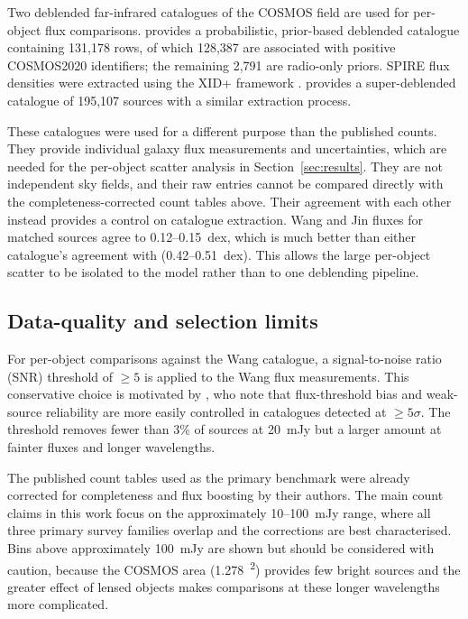 \documentclass[12pt,a4paper]{article}
\begin{document}
Two deblended far-infrared catalogues of the COSMOS field are used for per-object flux
comparisons. \citet{Wang_2024} provides a probabilistic, prior-based deblended catalogue
containing 131,178 rows, of which 128,387 are associated with positive COSMOS2020
identifiers; the remaining 2,791 are radio-only priors. SPIRE flux densities were
extracted using the XID+ framework \citep{Hurley_2017}. \citet{Jin_2018} provides a
super-deblended catalogue of 195,107 sources with a similar extraction process.

These catalogues were used for a different purpose than the published counts. They provide
individual galaxy flux measurements and uncertainties, which are needed for the
per-object scatter analysis in Section~\ref{sec:results}. They are not
independent sky fields, and their raw entries cannot be compared directly with the
completeness-corrected count tables above. Their agreement with each other instead
provides a control on catalogue extraction. Wang and Jin fluxes for matched sources agree to
0.12--\SI{0.15}{dex}, which is much better than either catalogue's agreement with
\popcosmos{} (0.42--\SI{0.51}{dex}). This allows the large per-object scatter to be isolated to
the model rather than to one deblending pipeline.

\subsection{Data-quality and selection limits}
\label{sec:data:quality}

For per-object comparisons against the Wang catalogue, a signal-to-noise ratio (SNR)
threshold of $\geq 5$ is applied to the Wang flux measurements. This conservative choice
is motivated by \citet{Clements_1999}, who note that flux-threshold bias and weak-source reliability are
more easily controlled in catalogues detected at $\geq 5\sigma$.
The threshold removes fewer than 3\% of sources at \SI{20}{mJy} but a larger amount
at fainter fluxes and longer wavelengths.

The published count tables used as the primary benchmark were already corrected for
completeness and flux boosting by their authors. The main count claims in this work focus on
the approximately 10--\SI{100}{mJy} range, where all three primary survey families
overlap and the corrections are best characterised. Bins above approximately
\SI{100}{mJy} are shown but should be considered with caution, because the COSMOS area
(\SI{1.278}{\deg\squared}) provides few bright sources and the greater effect of lensed
objects makes comparisons at these longer wavelengths more complicated.
\end{document}
